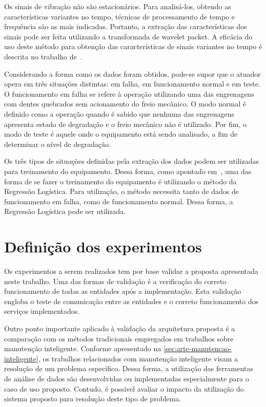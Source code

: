 Os sinais de vibração não são estacionários. Para analisá-los, obtendo as características variantes
no tempo, técnicas de processamento de tempo e frequência são as mais indicadas. Portanto, a
extração das características dos sinais pode ser feita utilizando a transformada de wavelet packet.
A eficácia do uso deste método para obtenção das características de sinais variantes no tempo é
descrita no trabalho de~\cite{qiu2006wavelet}.

Considerando a forma como os dados foram obtidos, pode-se supor que o atuador opera em três
situações distintas: em falha, em funcionamento normal e em teste. O funcionamento em falha se
refere à operação utilizando uma das engrenagens com dentes quebrados sem acionamento do freio
mecânico. O modo normal é definido como a operação quando é sabido que nenhuma das engrenagens
apresenta estado de degradação e o freio mecânico não é utilizado. Por fim, o modo de teste é aquele
onde o equipamento está sendo analisado, a fim de determinar o nível de degradação.

Os três tipos de situações definidas pela extração dos dados podem ser utilizadas para treinamento
do equipamento. Dessa forma, como apontado em~\cite{lazzaretti2012avaliacao}, uma das forma de se
fazer o treinamento do equipamento é utilizando o método da Regressão Logística. Para utilização, o
método necessita tanto de dados de funcionamento em falha, como de funcionamento normal. Dessa
forma, a Regressão Logística pode ser utilizada.


\section{Definição dos experimentos}
\label{sec:experimentos-definicao}

Os experimentos a serem realizados tem por base validar a proposta apresentada neste trabalho. Uma
das formas de validação é a verificação do correto funcionamento de todas as entidades após a
implementação. Esta validação engloba o teste de comunicação entre as entidades e o correto
funcionamento dos serviços implementados.

Outro ponto importante aplicado à validação da arquitetura proposta é a comparação com os métodos
tradicionais empregados em trabalhos sobre manutenção inteligente. Conforme apresentado na
\cref{sec:arte-manutencao-inteligente}, os trabalhos relacionados com manutenção inteligente visam a
resolução de um problema específico. Dessa forma, a utilização das ferramentas de análise de dados
são desenvolvidas ou implementadas especialmente para o caso de uso proposto. Contudo, é possível
avaliar o impacto da utilização do sistema proposto para resolução deste tipo de problema.


